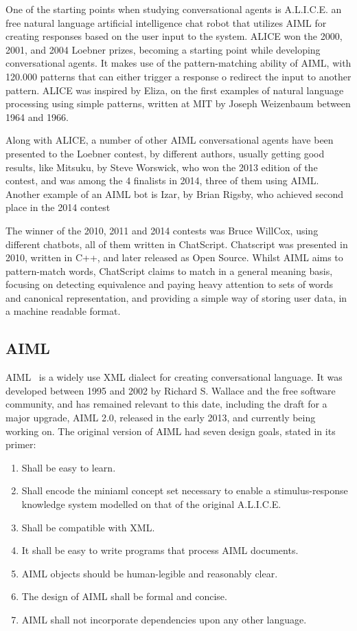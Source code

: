 One of the starting points when studying conversational agents is A.L.I.C.E. an free natural language artificial intelligence chat robot that utilizes AIML for creating responses based on the user input to the system. ALICE won the 2000, 2001, and 2004 Loebner prizes, becoming a starting point while developing conversational agents. It makes use of the pattern-matching ability of AIML, with 120.000 patterns that can either trigger a response o redirect the input to another pattern. ALICE was inspired by Eliza, on the first examples of natural language processing using simple patterns, written at MIT by Joseph Weizenbaum between 1964 and 1966.

Along with ALICE, a number of other AIML conversational agents have been presented to the Loebner contest, by different authors, usually getting good results, like Mitsuku, by Steve Worswick, who won the 2013 edition of the contest, and was among the 4 finalists in 2014, three of them using AIML. Another example of an AIML bot is Izar, by Brian Rigsby, who achieved second place in the 2014 contest

The winner of the 2010, 2011 and 2014 contests was Bruce WillCox, using different chatbots, all of them written in ChatScript. Chatscript was presented in 2010, written in C++, and later released as Open Source. Whilst AIML aims to pattern-match words, ChatScript claims to match in a general meaning basis, focusing on detecting equivalence and paying heavy attention to sets of words and canonical representation, and providing a simple way of storing user data, in a machine readable format.

\subsection{\ac{AIML}}

\ac{AIML}~\cite{aimlprimer} is a widely use XML dialect for creating conversational language. It was developed between 1995 and 2002 by Richard S. Wallace and the free software community, and has remained relevant to this date, including the draft for a major upgrade, AIML 2.0, released in the early 2013, and currently being working on. The original version of AIML had seven design goals, stated in its primer:
\begin{enumerate}%
  \item Shall be easy to learn.
  \item Shall encode the miniaml concept set necessary to enable a stimulus-response knowledge system modelled on that of the original A.L.I.C.E.
  \item Shall be compatible with XML.
  \item It shall be easy to write programs that process AIML documents.
  \item \ac{AIML} objects should be human-legible and reasonably clear.
  \item The design of \ac{AIML} shall be formal and concise.
  \item \ac{AIML} shall not incorporate dependencies upon any other language.
\end{enumerate}

